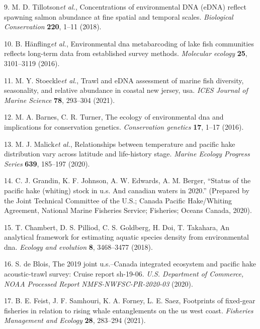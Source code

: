 \documentclass[
]{article}
\begin{document}
\leavevmode\hypertarget{ref-tillotson2018concentrations}{}%
9. M. D. Tillotson\emph{et al.}, Concentrations of environmental DNA
(eDNA) reflect spawning salmon abundance at fine spatial and temporal
scales. \emph{Biological Conservation} \textbf{220}, 1--11 (2018).

\leavevmode\hypertarget{ref-hanfling2016gillnet}{}%
10. B. Hänfling\emph{et al.}, Environmental dna metabarcoding of lake
fish communities reflects long-term data from established survey
methods. \emph{Molecular ecology} \textbf{25}, 3101--3119 (2016).

\leavevmode\hypertarget{ref-stoeckle2021trawl}{}%
11. M. Y. Stoeckle\emph{et al.}, Trawl and eDNA assessment of marine
fish diversity, seasonality, and relative abundance in coastal new
jersey, usa. \emph{ICES Journal of Marine Science} \textbf{78}, 293--304
(2021).

\leavevmode\hypertarget{ref-barnes2016ecology}{}%
12. M. A. Barnes, C. R. Turner, The ecology of environmental dna and
implications for conservation genetics. \emph{Conservation genetics}
\textbf{17}, 1--17 (2016).

\leavevmode\hypertarget{ref-malick2020relationships}{}%
13. M. J. Malick\emph{et al.}, Relationships between temperature and
pacific hake distribution vary across latitude and life-history stage.
\emph{Marine Ecology Progress Series} \textbf{639}, 185--197 (2020).

\leavevmode\hypertarget{ref-grandin2020assessment}{}%
14. C. J. Grandin, K. F. Johnson, A. W. Edwards, A. M. Berger, ``Status
of the pacific hake (whiting) stock in u.s. And canadian waters in
2020.'' (Prepared by the Joint Technical Committee of the U.S.; Canada
Pacific Hake/Whiting Agreement, National Marine Fisheries Service;
Fisheries; Oceans Canada, 2020).

\leavevmode\hypertarget{ref-chambert2018analytical}{}%
15. T. Chambert, D. S. Pilliod, C. S. Goldberg, H. Doi, T. Takahara, An
analytical framework for estimating aquatic species density from
environmental dna. \emph{Ecology and evolution} \textbf{8}, 3468--3477
(2018).

\leavevmode\hypertarget{ref-deBlois2020survey}{}%
16. S. de Blois, The 2019 joint u.s.--Canada integrated ecosystem and
pacific hake acoustic-trawl survey: Cruise report sh-19-06. \emph{U.S.
Department of Commerce, NOAA Processed Report NMFS-NWFSC-PR-2020-03}
(2020).

\leavevmode\hypertarget{ref-feist2021footprints}{}%
17. B. E. Feist, J. F. Samhouri, K. A. Forney, L. E. Saez, Footprints of
fixed-gear fisheries in relation to rising whale entanglements on the us
west coast. \emph{Fisheries Management and Ecology} \textbf{28},
283--294 (2021).
\end{document}
